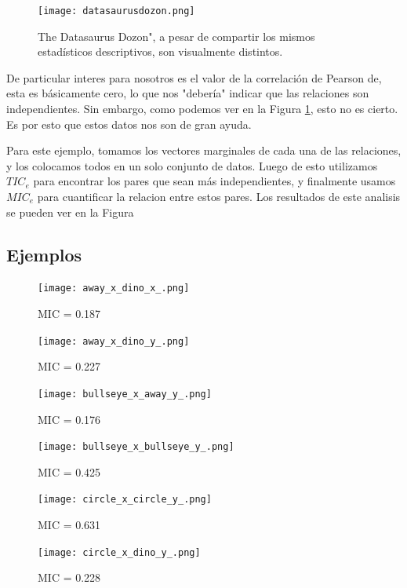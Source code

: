 	\begin{figure}[H] 
		\centering
		\texttt{[image: datasaurusdozon.png]}
		\caption{The Datasaurus Dozon", a pesar de compartir los mismos estad\'isticos descriptivos, son visualmente distintos.}
		\label{datasaurus_fig}
	\end{figure}

	De particular interes para nosotros es el valor de la correlaci\'on de Pearson de, esta es b\'asicamente cero, lo que nos "deber\'ia" indicar que las relaciones son independientes. Sin embargo, como podemos ver en la Figura \ref{datasaurus_fig}, esto no es cierto. Es por esto que estos datos nos son de gran ayuda. 

	Para este ejemplo, tomamos los vectores marginales de cada una de las relaciones, y los colocamos todos en un solo conjunto de datos. Luego de esto utilizamos $TIC_e$ para encontrar los pares que sean m\'as independientes, y finalmente usamos $MIC_e$ para cuantificar la relacion entre estos pares. Los resultados de este analisis se pueden ver en la Figura %

	

	\subsection[]{Ejemplos}
	\begin{figure}[H]
		\centering
		\texttt{[image: away\_x\_dino\_x\_.png]}
		\caption{ MIC = 0.187}
		\end{figure}
		
		\begin{figure}[H]
		\centering
		\texttt{[image: away\_x\_dino\_y\_.png]}
		\caption{ MIC = 0.227}
		\end{figure}
		
		\begin{figure}[H]
		\centering
		\texttt{[image: bullseye\_x\_away\_y\_.png]}
		\caption{ MIC = 0.176}
		\end{figure}
		
		\begin{figure}[H]
		\centering
		\texttt{[image: bullseye\_x\_bullseye\_y\_.png]}
		\caption{ MIC = 0.425}
		\end{figure}
		
		\begin{figure}[H]
		\centering
		\texttt{[image: circle\_x\_circle\_y\_.png]}
		\caption{ MIC = 0.631}
		\end{figure}
		
		\begin{figure}[H]
		\centering
		\texttt{[image: circle\_x\_dino\_y\_.png]}
		\caption{ MIC = 0.228}
		\end{figure}
		
